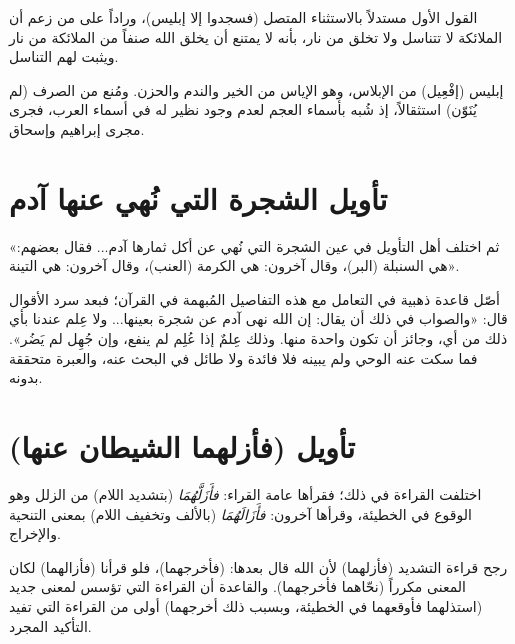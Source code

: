  القول الأول مستدلاً بالاستثناء المتصل (فسجدوا إلا إبليس)، وراداً على من زعم أن الملائكة لا تتناسل ولا تخلق من نار، بأنه لا يمتنع أن يخلق الله صنفاً من الملائكة من نار ويثبت لهم التناسل.

\begin{fawaid}
إبليس (إفْعِيل) من الإبلاس، وهو الإياس من الخير والندم والحزن. ومُنع من الصرف (لم يُنَوّن) استثقالاً، إذ شُبه بأسماء العجم لعدم وجود نظير له في أسماء العرب، فجرى مجرى إبراهيم وإسحاق.
\end{fawaid}

\separator

\section{تأويل الشجرة التي نُهي عنها آدم}
 «ثم اختلف أهل التأويل في عين الشجرة التي نُهي عن أكل ثمارها آدم... فقال بعضهم: هي السنبلة (البر)، وقال آخرون: هي الكرمة (العنب)، وقال آخرون: هي التينة».

\begin{fawaid}
أصّل  قاعدة ذهبية في التعامل مع هذه التفاصيل المُبهمة في القرآن؛ فبعد سرد الأقوال قال: «والصواب في ذلك أن يقال: إن الله نهى آدم عن شجرة بعينها... ولا عِلم عندنا بأي ذلك من أي، وجائز أن تكون واحدة منها. وذلك عِلمٌ إذا عُلِم لم ينفع، وإن جُهِل لم يَضُر». فما سكت عنه الوحي ولم يبينه فلا فائدة ولا طائل في البحث عنه، والعبرة متحققة بدونه.
\end{fawaid}

\separator

\section{تأويل (فأزلهما الشيطان عنها)}
اختلفت القراءة في ذلك؛ فقرأها عامة القراء: \textit{فأَزَلَّهُمَا} (بتشديد اللام) من الزلل وهو الوقوع في الخطيئة، وقرأها آخرون: \textit{فأَزَالَهُمَا} (بالألف وتخفيف اللام) بمعنى التنحية والإخراج.

\begin{fawaid}
رجح  قراءة التشديد (فأزلهما) لأن الله قال بعدها: (فأخرجهما)، فلو قرأنا (فأزالهما) لكان المعنى مكرراً (نحّاهما فأخرجهما). والقاعدة أن القراءة التي تؤسس لمعنى جديد (استذلهما فأوقعهما في الخطيئة، وبسبب ذلك أخرجهما) أولى من القراءة التي تفيد التأكيد المجرد.
\end{fawaid}

\separator


